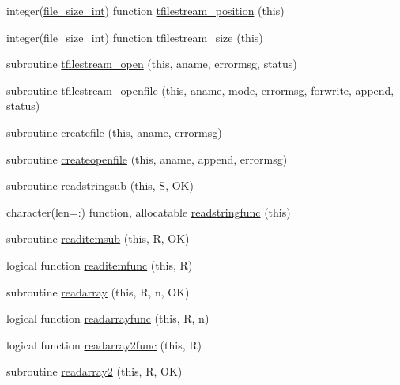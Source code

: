 \begin{DoxyCompactItemize}
\item 
integer(\mbox{\hyperlink{namespacefileutils_a334ae57c14956bd4597df7a130f6e8a8}{file\+\_\+size\+\_\+int}}) function \mbox{\hyperlink{namespacefileutils_a3ee651544233289579c63ab2ffa3f6ce}{tfilestream\+\_\+position}} (this)
\item 
integer(\mbox{\hyperlink{namespacefileutils_a334ae57c14956bd4597df7a130f6e8a8}{file\+\_\+size\+\_\+int}}) function \mbox{\hyperlink{namespacefileutils_ab4722eb4f85ef9a9326342dfcad3f0cc}{tfilestream\+\_\+size}} (this)
\item 
subroutine \mbox{\hyperlink{namespacefileutils_a9b6ffe40088ad819c1e793b2bc91b01e}{tfilestream\+\_\+open}} (this, aname, errormsg, status)
\item 
subroutine \mbox{\hyperlink{namespacefileutils_ae08cbb1a056e184eeab9c6a6a2181f24}{tfilestream\+\_\+openfile}} (this, aname, mode, errormsg, forwrite, append, status)
\item 
subroutine \mbox{\hyperlink{namespacefileutils_a40850ce0c16a35137a51f9e4316d2599}{createfile}} (this, aname, errormsg)
\item 
subroutine \mbox{\hyperlink{namespacefileutils_ae16c8e138a245fc238bc5e6d29b3415b}{createopenfile}} (this, aname, append, errormsg)
\item 
subroutine \mbox{\hyperlink{namespacefileutils_a436d1ea1bb13200971bcbef4e268f503}{readstringsub}} (this, S, OK)
\item 
character(len=\+:) function, allocatable \mbox{\hyperlink{namespacefileutils_a8b83c2f06ad952435c760ce789a1b01e}{readstringfunc}} (this)
\item 
subroutine \mbox{\hyperlink{namespacefileutils_a520a8d58db5cabd4d1fcaf5fbf9eeb94}{readitemsub}} (this, R, OK)
\item 
logical function \mbox{\hyperlink{namespacefileutils_a34cb445c075820131b56989e563c773c}{readitemfunc}} (this, R)
\item 
subroutine \mbox{\hyperlink{namespacefileutils_a77d1826f1c337fc426cfbc7a8d2b642a}{readarray}} (this, R, n, OK)
\item 
logical function \mbox{\hyperlink{namespacefileutils_a25c117441044cad4593a6e88245d59d2}{readarrayfunc}} (this, R, n)
\item 
logical function \mbox{\hyperlink{namespacefileutils_abe905cf8167e2a6f36f2ddfcec24b6ad}{readarray2func}} (this, R)
\item 
subroutine \mbox{\hyperlink{namespacefileutils_a1decdb16477082bdf6b48d9feb1accf7}{readarray2}} (this, R, OK)
\item 

\end{DoxyCompactItemize}
